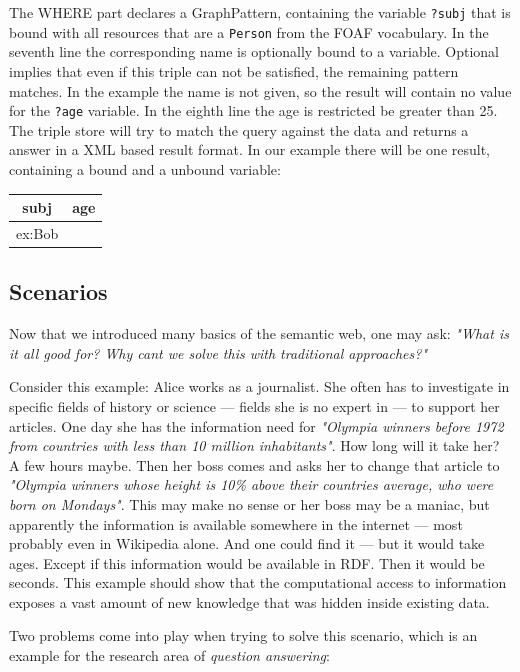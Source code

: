 The WHERE part declares a GraphPattern, containing the variable \texttt{?subj} that is bound with all resources that are a \texttt{Person} from the FOAF vocabulary. 
In the seventh line the corresponding name is optionally bound to a variable. Optional implies that even if this triple can not be satisfied, the remaining pattern matches. In the example the name is not given, so the result will contain no value for the \texttt{?age} variable.
In the eighth line the age is restricted be greater than 25. 
The triple store will try to match the query against the data and returns a answer in a XML based result format.
In our example there will be one result, containing a bound and a unbound variable:
\begin{table}[h!]
\centering
\begin{tabular}{|c|c|}
\hline subj & age \\ 
\hline ex:Bob &  \\ 
\hline 
\end{tabular} 
\end{table}

\subsection{Scenarios}
Now that we introduced many basics of the semantic web, one may ask: \textit{"What is it all good for? Why cant we solve this with traditional approaches?"}

Consider this example: Alice works as a journalist. She often has to investigate in specific fields of history or science --- fields she is no expert in --- to support her articles. One day she has the information need for \textit{"Olympia winners before 1972 from countries with less than 10 million inhabitants"}. How long will it take her? A few hours maybe. Then her boss comes and asks her to change that article to \textit{"Olympia winners whose height is 10\% above their countries average, who were born on Mondays"}. This may make no sense or her boss may be a maniac, but apparently the information is available somewhere in the internet --- most probably even in Wikipedia alone. And one could find it --- but it would take ages. Except if this information would be available in RDF. Then it would be seconds. This example should show that the computational access to information exposes a vast amount of new knowledge that was hidden inside existing data.

Two problems come into play when trying to solve this scenario, which is an example for the research area of \textit{question answering}:

